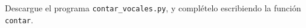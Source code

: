 Descargue el programa \verb+contar_vocales.py+,
y complételo escribiendo la función \verb+contar+.

\begin{minipage}[t]{.60\textwidth}
  
\end{minipage}

